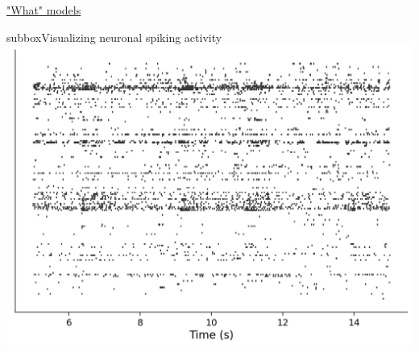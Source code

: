 \begin{textbox}{\href{https://compneuro.neuromatch.io/tutorials/W1D1_ModelTypes/student/W1D1_Tutorial1.html}{"What" models } }
\begin{subbox}{subbox}{Visualizing neuronal spiking activity}
\centering
\includegraphics[scale=0.3]{Figures/MT/MT_Figure2.png}
\end{subbox}
\end{textbox}
